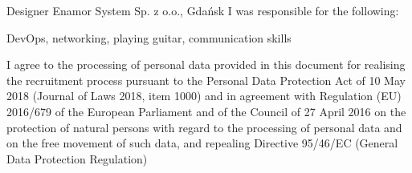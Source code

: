 \documentclass{cvClass} %
\begin{document}
   {
      \experience
        {Designer}
        {Enamor System Sp. z o.o., Gdańsk}
        {I was responsible for the following:} {
        }
    }

  
   {DevOps, networking, playing guitar, communication skills}

  \vfill
    {I agree to the processing of personal data provided in this document for realising the recruitment process pursuant to the Personal Data Protection Act of 10 May 2018 (Journal of Laws 2018, item 1000) and in agreement with Regulation (EU) 2016/679 of the European Parliament and of the Council of 27 April 2016 on the protection of natural persons with regard to the processing of personal data and on the free movement of such data, and repealing Directive 95/46/EC (General Data Protection Regulation)}
\end{document}
